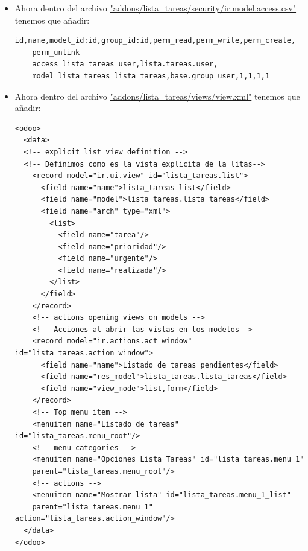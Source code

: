 \documentclass[a4paper,12pt]{article}
\begin{document}
\begin{itemize}
\begin{Verbatim}[frame=single, fontsize=\small]
        #Nombre y descripcion del modelo de datos
        _name = 'lista_tareas.lista_tareas'
        _description = 'lista_tareas.lista_tareas'
        #Elementos de cada fila del modelo de datos
        #Los tipos de datos a usar en el ORM son
        tarea = fields.Char(string="Tarea")
        prioridad = fields.Integer(string="Prioridad")
        urgente = fields.Boolean(compute="_value_urgente", store=True)
        realizada = fields.Boolean(string="Realizada")
        @api.depends('prioridad')
        def _value_urgente(self):
            #Para cada registro
            for record in self:
                #Si la prioridad es mayor que 10, se considera 
                urgente, en otro caso no lo es
                if record.prioridad>10:
                    record.urgente = True
                else:
                    record.urgente = False
    \end{Verbatim}
    \item Ahora dentro del archivo \url{"addons/lista_tareas/security/ir.model.access.csv"} tenemos que añadir:
        \begin{Verbatim}[frame=single, fontsize=\small]
    id,name,model_id:id,group_id:id,perm_read,perm_write,perm_create,
    perm_unlink
    access_lista_tareas_user,lista.tareas.user,
    model_lista_tareas_lista_tareas,base.group_user,1,1,1,1
    \end{Verbatim}
    \item Ahora dentro del archivo \url{"addons/lista_tareas/views/view.xml"} tenemos que añadir:
        \begin{Verbatim}[frame=single, fontsize=\small]
    <odoo>
  <data>
  <!-- explicit list view definition -->
  <!-- Definimos como es la vista explicita de la litas-->
    <record model="ir.ui.view" id="lista_tareas.list">
      <field name="name">lista_tareas list</field>
      <field name="model">lista_tareas.lista_tareas</field>
      <field name="arch" type="xml">
        <list>
          <field name="tarea"/>
          <field name="prioridad"/>
          <field name="urgente"/>
          <field name="realizada"/>
        </list>
      </field>
    </record>
    <!-- actions opening views on models -->
    <!-- Acciones al abrir las vistas en los modelos-->
    <record model="ir.actions.act_window" id="lista_tareas.action_window">
      <field name="name">Listado de tareas pendientes</field>
      <field name="res_model">lista_tareas.lista_tareas</field>
      <field name="view_mode">list,form</field>
    </record>
    <!-- Top menu item -->
    <menuitem name="Listado de tareas" id="lista_tareas.menu_root"/>
    <!-- menu categories -->
    <menuitem name="Opciones Lista Tareas" id="lista_tareas.menu_1" 
    parent="lista_tareas.menu_root"/>
    <!-- actions -->
    <menuitem name="Mostrar lista" id="lista_tareas.menu_1_list" 
    parent="lista_tareas.menu_1" action="lista_tareas.action_window"/>
  </data>
</odoo>
    \end{Verbatim}
    

\end{itemize}
\end{document}
